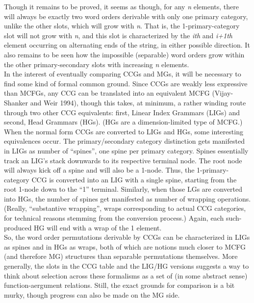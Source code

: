 \documentclass[12pt]{article}
\begin{document}
\noindent Though it remains to be proved, it seems as though, for any \textit{n} elements, there will always be exactly two word orders derivable with only one primary category, unlike the other slots, which will grow with \textit{n}. That is, the 1-primary-category slot will not grow with \textit{n}, and this slot is characterized by the \textit{ith} and \textit{i+1th} element occurring on alternating ends of the string, in either possible direction. It also remains to be seen how the impossible (separable) word orders grow within the other primary-secondary slots with increasing \textit{n} elements.\\

\noindent In the interest of eventually comparing CCGs and MGs, it will be necessary to find some kind of formal common ground. Since CCGs are weakly less expressive than MCFGs, any CCG can be translated into an equivalent MCFG (Vijay-Shanker and Weir 1994), though this takes, at minimum, a rather winding route through two other CCG equivalents: first, Linear Index Grammars (LIGs) and second, Head Grammars (HGs). (HGs are a dimension-limited type of MCFG.) When the normal form CCGs are converted to LIGs and HGs, some interesting equivalences occur. The primary/secondary category distinction gets manifested in LIGs as number of ``spines'', one spine per primary category. Spines essentially track an LIG's stack downwards to its respective terminal node. The root node will always kick off a spine and will also be a 1-node. Thus, the 1-primary-category CCG is converted into an LIG with a single spine, starting from the root 1-node down to the ``1'' terminal. Similarly, when those LGs are converted into HGs, the number of spines get manifested as number of wrapping operations. (Really, ``substantive wrapping'', wraps corresponding to actual CCG categories, for technical reasons stemming from the conversion process.) Again, each such-produced HG will end with a wrap of the 1 element.\\

\noindent So, the word order permutations derivable by CCGs can be characterized in LIGs as spines and in HGs as wraps, both of which are notions much closer to MCFG (and therefore MG) structures than separable permutations themselves. More generally, the slots in the CCG table and the LIG/HG versions suggests a way to think about selection across these formalisms as a set of (in some abstract sense) function-aergument relations. Still, the exact grounds for comparison is a bit murky, though progress can also be made on the MG side.
\end{document}

